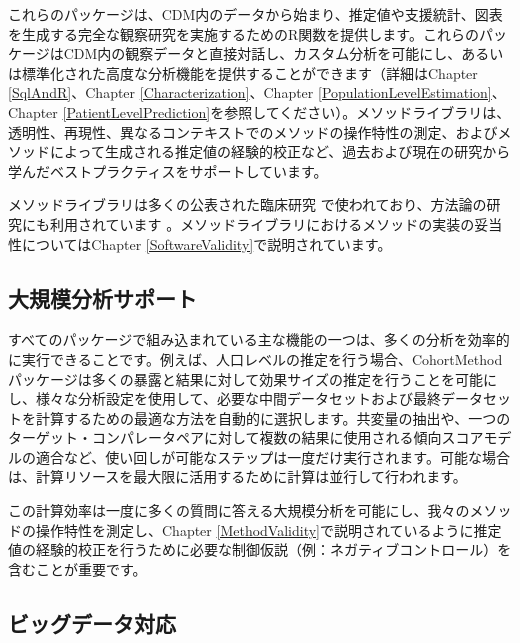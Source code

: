 \documentclass[
  11pt]{book}
\theoremstyle{definition}
\theoremstyle{definition}
\theoremstyle{definition}
\theoremstyle{definition}
\theoremstyle{remark}
\begin{document}
これらのパッケージは、CDM内のデータから始まり、推定値や支援統計、図表を生成する完全な観察研究を実施するためのR関数を提供します。これらのパッケージはCDM内の観察データと直接対話し、カスタム分析を可能にし、あるいは標準化された高度な分析機能を提供することができます（詳細はChapter \ref{SqlAndR}、Chapter \ref{Characterization}、Chapter \ref{PopulationLevelEstimation}、Chapter \ref{PatientLevelPrediction}を参照してください）。メソッドライブラリは、透明性、再現性、異なるコンテキストでのメソッドの操作特性の測定、およびメソッドによって生成される推定値の経験的校正など、過去および現在の研究から学んだベストプラクティスをサポートしています。

メソッドライブラリは多くの公表された臨床研究 \citetext{\citealp[ ]{boland_2017}; \citealp[ ]{duke_2017}; \citealp[ ]{ramcharran_2017}; \citealp[ ]{weinstein_2017}; \citealp[ ]{wang_2017}; \citealp[ ]{ryan_2017}; \citealp[ ]{ryan_2018}; \citealp[ ]{vashisht_2018}; \citealp[ ]{yuan_2018}; \citealp[ ]{johnston_2019}} で使われており、方法論の研究にも利用されています \citetext{\citealp[ ]{schuemie_2014}; \citealp[ ]{schuemie_2016}; \citealp[ ]{reps2018}; \citealp[ ]{tian_2018}; \citealp[ ]{schuemie_2018}; \citealp[ ]{schuemie_2018b}; \citealp[ ]{reps_2019}}。メソッドライブラリにおけるメソッドの実装の妥当性についてはChapter \ref{SoftwareValidity}で説明されています。

\subsection{大規模分析サポート}\label{ux5927ux898fux6a21ux5206ux6790ux30b5ux30ddux30fcux30c8}

すべてのパッケージで組み込まれている主な機能の一つは、多くの分析を効率的に実行できることです。例えば、人口レベルの推定を行う場合、CohortMethodパッケージは多くの暴露と結果に対して効果サイズの推定を行うことを可能にし、様々な分析設定を使用して、必要な中間データセットおよび最終データセットを計算するための最適な方法を自動的に選択します。共変量の抽出や、一つのターゲット・コンパレータペアに対して複数の結果に使用される傾向スコアモデルの適合など、使い回しが可能なステップは一度だけ実行されます。可能な場合は、計算リソースを最大限に活用するために計算は並行して行われます。

この計算効率は一度に多くの質問に答える大規模分析を可能にし、我々のメソッドの操作特性を測定し、Chapter \ref{MethodValidity}で説明されているように推定値の経験的校正を行うために必要な制御仮説（例：ネガティブコントロール）を含むことが重要です。 

\subsection{ビッグデータ対応}\label{BigDataSupport}
\end{document}

